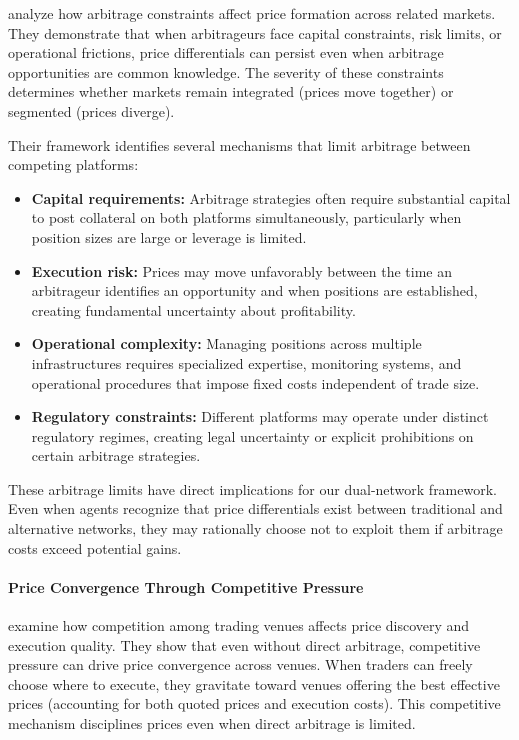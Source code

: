  analyze how arbitrage constraints affect price formation across related markets. They demonstrate that when arbitrageurs face capital constraints, risk limits, or operational frictions, price differentials can persist even when arbitrage opportunities are common knowledge. The severity of these constraints determines whether markets remain integrated (prices move together) or segmented (prices diverge).

Their framework identifies several mechanisms that limit arbitrage between competing platforms:

\begin{itemize}
    \item \textbf{Capital requirements:} Arbitrage strategies often require substantial capital to post collateral on both platforms simultaneously, particularly when position sizes are large or leverage is limited.
    
    \item \textbf{Execution risk:} Prices may move unfavorably between the time an arbitrageur identifies an opportunity and when positions are established, creating fundamental uncertainty about profitability.
    
    \item \textbf{Operational complexity:} Managing positions across multiple infrastructures requires specialized expertise, monitoring systems, and operational procedures that impose fixed costs independent of trade size.
    
    \item \textbf{Regulatory constraints:} Different platforms may operate under distinct regulatory regimes, creating legal uncertainty or explicit prohibitions on certain arbitrage strategies.
\end{itemize}

These arbitrage limits have direct implications for our dual-network framework. Even when agents recognize that price differentials exist between traditional and alternative networks, they may rationally choose not to exploit them if arbitrage costs exceed potential gains.

\paragraph{Price Convergence Through Competitive Pressure}

 examine how competition among trading venues affects price discovery and execution quality. They show that even without direct arbitrage, competitive pressure can drive price convergence across venues. When traders can freely choose where to execute, they gravitate toward venues offering the best effective prices (accounting for both quoted prices and execution costs). This competitive mechanism disciplines prices even when direct arbitrage is limited.

